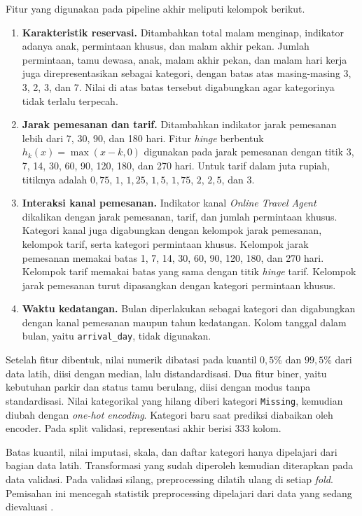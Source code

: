 Fitur yang digunakan pada pipeline akhir meliputi kelompok berikut.
\begin{enumerate}
    \item \textbf{Karakteristik reservasi.} Ditambahkan total malam menginap, indikator adanya anak, permintaan khusus, dan malam akhir pekan. Jumlah permintaan, tamu dewasa, anak, malam akhir pekan, dan malam hari kerja juga direpresentasikan sebagai kategori, dengan batas atas masing-masing 3, 3, 2, 3, dan 7. Nilai di atas batas tersebut digabungkan agar kategorinya tidak terlalu terpecah.
    \item \textbf{Jarak pemesanan dan tarif.} Ditambahkan indikator jarak pemesanan lebih dari 7, 30, 90, dan 180 hari. Fitur \textit{hinge} berbentuk $h_k(x)=\max(x-k,0)$ digunakan pada jarak pemesanan dengan titik 3, 7, 14, 30, 60, 90, 120, 180, dan 270 hari. Untuk tarif dalam juta rupiah, titiknya adalah $0{,}75$, $1$, $1{,}25$, $1{,}5$, $1{,}75$, $2$, $2{,}5$, dan $3$.
    \item \textbf{Interaksi kanal pemesanan.} Indikator kanal \textit{Online Travel Agent} dikalikan dengan jarak pemesanan, tarif, dan jumlah permintaan khusus. Kategori kanal juga digabungkan dengan kelompok jarak pemesanan, kelompok tarif, serta kategori permintaan khusus. Kelompok jarak pemesanan memakai batas 1, 7, 14, 30, 60, 90, 120, 180, dan 270 hari. Kelompok tarif memakai batas yang sama dengan titik \textit{hinge} tarif. Kelompok jarak pemesanan turut dipasangkan dengan kategori permintaan khusus.
    \item \textbf{Waktu kedatangan.} Bulan diperlakukan sebagai kategori dan digabungkan dengan kanal pemesanan maupun tahun kedatangan. Kolom tanggal dalam bulan, yaitu \texttt{arrival\_day}, tidak digunakan.
\end{enumerate}

Setelah fitur dibentuk, nilai numerik dibatasi pada kuantil $0{,}5\%$ dan $99{,}5\%$ dari data latih, diisi dengan median, lalu distandardisasi. Dua fitur biner, yaitu kebutuhan parkir dan status tamu berulang, diisi dengan modus tanpa standardisasi. Nilai kategorikal yang hilang diberi kategori \texttt{Missing}, kemudian diubah dengan \textit{one-hot encoding}. Kategori baru saat prediksi diabaikan oleh encoder. Pada split validasi, representasi akhir berisi 333 kolom.

Batas kuantil, nilai imputasi, skala, dan daftar kategori hanya dipelajari dari bagian data latih. Transformasi yang sudah diperoleh kemudian diterapkan pada data validasi. Pada validasi silang, preprocessing dilatih ulang di setiap \textit{fold}. Pemisahan ini mencegah statistik preprocessing dipelajari dari data yang sedang dievaluasi \cite{scikitlearn_pitfalls}.

